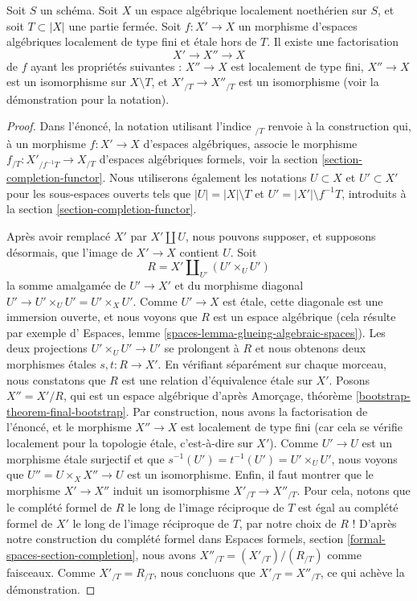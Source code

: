 \begin{lemma}
\label{lemma-smash-away-from-T}
Soit $S$ un schéma. Soit $X$ un espace algébrique localement noethérien sur
$S$, et soit $T \subset |X|$ une partie fermée. Soit $f : X' \to X$ un
morphisme d'espaces algébriques localement de type fini et étale hors de $T$.
Il existe une factorisation
$$
X' \longrightarrow X'' \longrightarrow X
$$
de $f$ ayant les propriétés suivantes :
$X'' \to X$ est localement de type fini,
$X'' \to X$ est un isomorphisme sur $X \setminus T$, et
$X'_{/T} \to X''_{/T}$ est un isomorphisme (voir la démonstration pour la notation).
\end{lemma}

\begin{proof}
Dans l'énoncé, la notation utilisant l'indice ${}_{/T}$ renvoie à la
construction qui, à un morphisme $f : X' \to X$ d'espaces algébriques,
associe le morphisme $f_{/T} : X'_{/f^{-1}T} \to X_{/T}$ d'espaces
algébriques formels, voir la section \ref{section-completion-functor}.
Nous utiliserons également les notations $U \subset X$ et $U' \subset X'$
pour les sous-espaces ouverts tels que $|U| = |X| \setminus T$ et
$U' = |X'| \setminus f^{-1}T$, introduits à la
section \ref{section-completion-functor}.

\medskip\noindent
Après avoir remplacé $X'$ par $X' \amalg U$, nous pouvons supposer, et
supposons désormais, que l'image de $X' \to X$ contient $U$.
Soit
$$
R = X' \amalg_{U'} (U' \times_U U')
$$
la somme amalgamée de $U' \to X'$ et du morphisme diagonal
$U' \to U' \times_U U' = U' \times_X U'$. Comme $U' \to X$ est étale,
cette diagonale est une immersion ouverte, et nous voyons que $R$ est un
espace algébrique (cela résulte par exemple d'
Espaces, lemme \ref{spaces-lemma-glueing-algebraic-spaces}).
Les deux projections $U' \times_U U' \to U'$ se prolongent à $R$
et nous obtenons deux morphismes étales $s, t : R \to X'$.
En vérifiant séparément sur chaque morceau, nous constatons que $R$
est une relation d'équivalence étale sur $X'$. Posons $X'' = X'/R$,
qui est un espace algébrique d'après
Amorçage, théorème \ref{bootstrap-theorem-final-bootstrap}.
Par construction, nous avons la factorisation de l'énoncé, et
le morphisme $X'' \to X$ est localement de type fini (car cela
se vérifie localement pour la topologie étale, c'est-à-dire sur $X'$).
Comme $U' \to U$ est un morphisme étale surjectif
et que $s^{-1}(U') = t^{-1}(U') = U' \times_U U'$,
nous voyons que $U'' = U \times_X X'' \to U$ est un isomorphisme.
Enfin, il faut montrer que le morphisme $X' \to X''$ induit un isomorphisme
$X'_{/T} \to X''_{/T}$. Pour cela, notons que le complété formel de $R$
le long de l'image réciproque de $T$ est égal au complété formel de
$X'$ le long de l'image réciproque de $T$, par notre choix de $R$ ! D'après
notre construction du complété formel dans
Espaces formels, section \ref{formal-spaces-section-completion},
nous avons $X''_{/T} = (X'_{/T}) / (R_{/T})$ comme faisceaux. Comme
$X'_{/T} = R_{/T}$, nous concluons que $X'_{/T} = X''_{/T}$,
ce qui achève la démonstration.
\end{proof}








